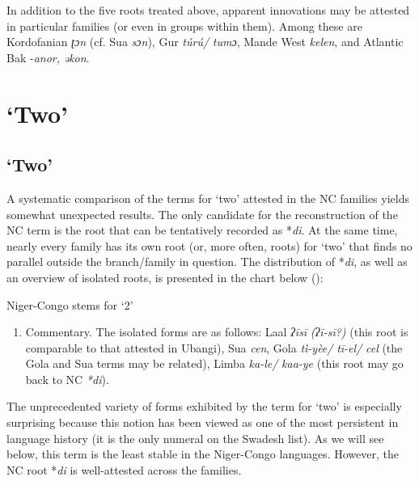 In addition to the five roots treated above, apparent innovations may be attested in particular families (or even in groups within them). Among these are Kordofanian \textit{ʈɔn} (cf. Sua \textit{sɔn}), Gur \textit{t{\'{u}}r{\'{u}}/} \textit{tumɔ}, Mande West \textit{kelen}, and Atlantic Bak -\textit{anor,} \textit{əkon}.

\clearpage
\section{‘Two’}%

\subsection{‘Two’}%
A systematic comparison of the terms for ‘two’ attested in the NC families yields somewhat unexpected results. The only candidate for the reconstruction of the NC term is the root that can be tentatively recorded as *\textit{di}. At the same time, nearly every family has its own root (or, more often, roots) for ‘two’ that finds no parallel outside the branch/family in question. The distribution of *\textit{di}, as well as an overview of isolated roots, is presented in the chart below ():

\begin{table}
\caption{\label{tab:4:2}Niger-Congo stems for `2'}
\kppyramid



\end{table}
\begin{enumerate}
\item Commentary. The isolated forms are as follows: Laal \textit{ʔ{\={i}}s{\={i}}} \textit{(ʔ{\={i}}-s{\={i}}?)} (this root is comparable to that attested in Ubangi), Sua \textit{cen}, Gola \textit{tì-yèe/} \textit{t{\={i}}-el/} \textit{cel}  (the Gola and Sua terms may be related), Limba \textit{ka-le/} \textit{kaa-ye} (this root may go back to NC \textit{*di}). 
\end{enumerate}
The unprecedented variety of forms exhibited by the term for ‘two’ is especially surprising because this notion has been viewed as one of the most persistent in language history (it is the only numeral on the Swadesh list). As we will see below, this term is the least stable in the Niger-Congo languages. However, the NC root *\textit{di} is well-attested across the families.

